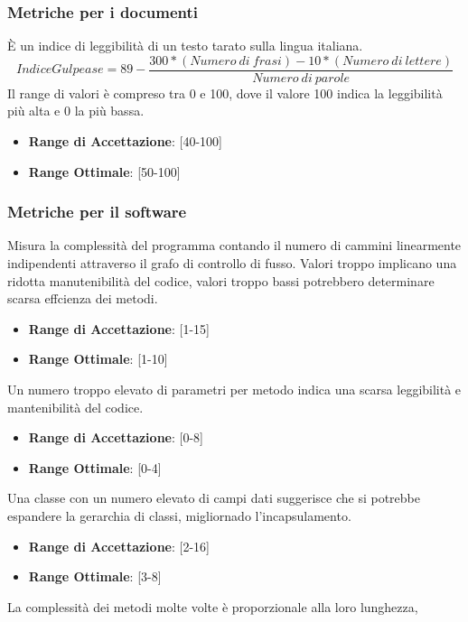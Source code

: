 \documentclass[12pt,a4paper]{article}
\begin{document}
\subsubsection{Metriche per i documenti}\label{metriche_doc}
È un indice di leggibilità di un testo tarato sulla lingua italiana.
\[IndiceGulpease=89-\frac{300*(Numero\ di\ frasi)-10*(Numero\ di\ lettere)}{Numero\ di\ parole}\]
Il range di valori è compreso tra 0 e 100, dove il valore 100 indica la leggibilità più alta e 0 la più bassa.
\begin{itemize}
\item \textbf{Range di Accettazione}: [40-100]
\item \textbf{Range Ottimale}: [50-100]
\end{itemize}
\subsubsection{ Metriche per il software}\label{metriche_sw}
Misura la complessità del programma contando il numero di cammini linearmente indipendenti attraverso il grafo di controllo di fusso. Valori troppo implicano una ridotta manutenibilità del codice, valori troppo bassi potrebbero determinare scarsa effcienza dei metodi.
\begin{itemize}
\item \textbf{Range di Accettazione}: [1-15]
\item \textbf{Range Ottimale}: [1-10]
\end{itemize}
Un numero troppo elevato di parametri per metodo indica una scarsa leggibilità e mantenibilità del codice.
\begin{itemize}
\item \textbf{Range di Accettazione}: [0-8]
\item \textbf{Range Ottimale}: [0-4]
\end{itemize}
Una classe con un numero elevato di campi dati suggerisce che si potrebbe espandere la gerarchia di classi, migliornado l'incapsulamento.
\begin{itemize}
\item \textbf{Range di Accettazione}: [2-16]
\item \textbf{Range Ottimale}: [3-8]
\end{itemize}
La complessità dei metodi molte volte è proporzionale alla loro lunghezza,
\end{document}
